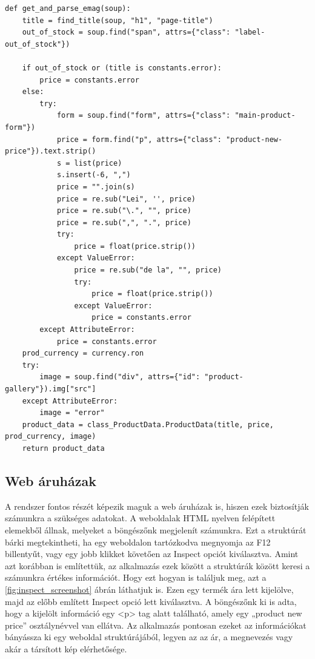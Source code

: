 \begin{lstlisting}[caption={Emag linket feldolgozó függvény}, label={lst:python_emag}, basicstyle=\footnotesize]
    def get_and_parse_emag(soup):
    title = find_title(soup, "h1", "page-title")
    out_of_stock = soup.find("span", attrs={"class": "label-out_of_stock"})

    if out_of_stock or (title is constants.error):
        price = constants.error
    else:
        try:
            form = soup.find("form", attrs={"class": "main-product-form"})
            price = form.find("p", attrs={"class": "product-new-price"}).text.strip()
            s = list(price)
            s.insert(-6, ",")
            price = "".join(s)
            price = re.sub("Lei", '', price)
            price = re.sub("\.", "", price)
            price = re.sub(",", ".", price)
            try:
                price = float(price.strip())
            except ValueError:
                price = re.sub("de la", "", price)
                try:
                    price = float(price.strip())
                except ValueError:
                    price = constants.error
        except AttributeError:
            price = constants.error
    prod_currency = currency.ron
    try:
        image = soup.find("div", attrs={"id": "product-gallery"}).img["src"]
    except AttributeError:
        image = "error"
    product_data = class_ProductData.ProductData(title, price, prod_currency, image)
    return product_data
\end{lstlisting}

\subsection{Web áruházak}

A rendszer fontos részét képezik maguk a web áruházak is, hiszen ezek biztosítják számunkra a szükséges adatokat. A weboldalak HTML nyelven felépített elemekből állnak, melyeket a böngészőnk megjelenít számunkra. Ezt a struktúrát bárki megtekintheti, ha egy weboldalon tartózkodva megnyomja az F12 billentyűt, vagy egy jobb klikket követően az Inspect opciót kiválasztva. Amint azt korábban is említettük, az alkalmazás ezek között a struktúrák között keresi a számunkra értékes információt. Hogy ezt hogyan is találjuk meg, azt a \ref{fig:inspect_screenshot} ábrán láthatjuk is. Ezen egy termék ára lett kijelölve, majd az előbb említett Inspect opció lett kiválasztva. A böngészőnk ki is adta, hogy a kijelölt információ egy <p> tag alatt található, amely egy „product new price” osztálynévvel van ellátva. Az alkalmazás pontosan ezeket az információkat bányássza ki egy weboldal struktúrájából, legyen az az ár, a megnevezés vagy akár a társított kép elérhetősége.


